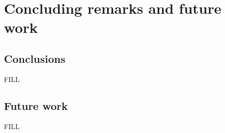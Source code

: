 \chapter{Concluding remarks and future work}
\section{Conclusions}\label{sec:conclusion}
FILL

\section{Future work}
FILL